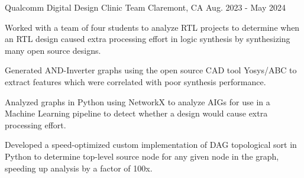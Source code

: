   \begin{cventry}
    {Qualcomm} %
    {Digital Design Clinic Team} %
    {Claremont, CA} %
    {Aug. 2023 - May 2024} %
    {
    \begin{cvitems}
      \item{
      Worked with a team of four students to analyze RTL projects to determine when an RTL design caused extra processing effort in logic synthesis by synthesizing many open source designs.
      }
      \item{
      Generated AND-Inverter graphs using the open source CAD tool Yosys/ABC to extract features which were correlated with poor synthesis performance.
      }
      \item{
      Analyzed graphs in Python using NetworkX to analyze AIGs for use in a Machine Learning pipeline to detect whether a design would cause extra processing effort.
      }
      \item {
      Developed a speed-optimized custom implementation of DAG topological sort in Python to determine top-level source node for any given node in the graph, speeding up analysis by a factor of 100x.
      }
    \end{cvitems}
    }
  \end{cventry}
